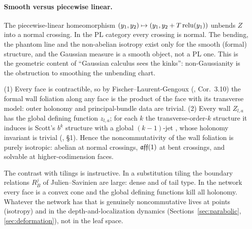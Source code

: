 \paragraph{Smooth versus piecewise linear.} The piecewise-linear homeomorphism $(y_1,y_2)\mapsto(y_1,y_2+T\operatorname{relu}(y_1))$ unbends $Z$ into a
normal crossing. In the PL category every crossing is normal. The bending, the phantom line and the non-abelian isotropy exist only for
the smooth (formal) structure, and the Gaussian measure is a smooth object, not a PL one. This is the geometric content of ``Gaussian
calculus sees the kinks'': non-Gaussianity is the obstruction to smoothing the unbending chart.

\begin{proposition}[No holonomy]\label{prop:noholonomy}
(1) Every face is contractible, so by Fischer--Laurent-Gengoux (\cite{FLG}, Cor.~3.10) the formal wall foliation along any face is the
product of the face with its transverse model: outer holonomy and principal-bundle data are trivial. (2) Every wall $Z_{l,a}$ has the
global defining function $z_{l,a}$; for each $k$ the transverse-order-$k$ structure it induces is Scott's $b^k$ structure with a global
$(k-1)$-jet \cite{Scott}, whose holonomy invariant is trivial (\cite{Francis}, \S1). Hence the noncommutativity of the wall foliation is purely
isotropic: abelian at normal crossings, $\mathfrak{aff}(1)$ at bent crossings, and solvable at higher-codimension faces.
\end{proposition}
The contrast with tilings is instructive. In a substitution tiling the boundary relations $R^j_B$ of Julien--Savinien are large: dense and
of tail type. In the network every face is a convex cone and the global defining functions kill all holonomy. Whatever the network has
that is genuinely noncommutative lives at points (isotropy) and in the depth-and-localization dynamics (Sections~\ref{sec:parabolic},
\ref{sec:deformation}), not in the leaf space.

